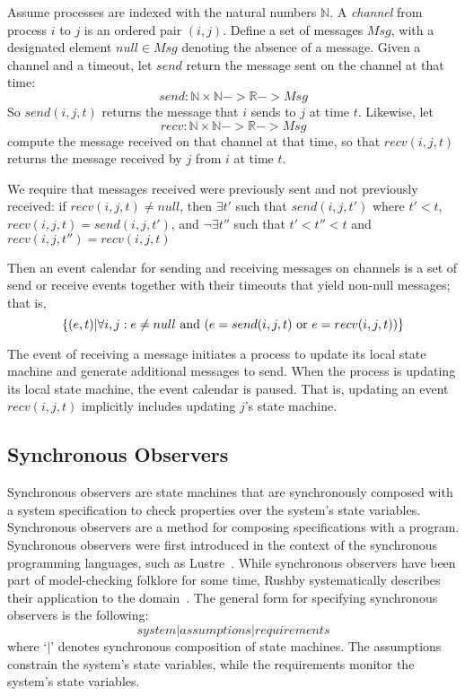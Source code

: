 \documentclass{IEEEtran/IEEEtran}
\newcommand{\lee}[1]{ } %
\newcommand{\lee}[1]{ {\color{blue}$<$lee: #1$>$} } %
\begin{document}
Assume processes are indexed with the natural numbers $\mathbb{N}$. A \emph{channel} from process $i$ to $j$ is an ordered pair $(i,j)$. Define a set of messages $Msg$, with a designated element $null \in Msg$ denoting the absence of a message. Given a channel and a timeout, let $send$ return the message sent on the channel at that time:
$$send : \mathbb{N} \times \mathbb{N} -> \mathbb{R} -> Msg$$
So $send(i, j, t)$ returns the message that $i$ sends to $j$ at time $t$. Likewise, let
$$recv : \mathbb{N} \times \mathbb{N} -> \mathbb{R} -> Msg$$
compute the message received on that channel at that time, so that $recv(i, j, t)$ returns the message received by $j$ from $i$ at time $t$.

We require that messages received were previously sent and not previously received: if $recv(i, j, t) \neq null$, then $\exists t'$ such that $send(i, j, t')$ where $t' < t$, $recv(i, j, t) = send(i, j, t')$, and $\neg\exists t''$ such that $t' < t'' < t$ and $recv(i, j, t'') = recv(i, j, t)$

Then an event calendar for sending and receiving messages on channels is a set of send or receive events together with their timeouts that yield non-null messages; that is,
$$
\{ (e, t) | \forall i,j: e \neq null \textnormal{ and } (e = send(i, j, t) \textnormal{ or } e = recv(i, j, t))
\}
$$

\lee{technically, atomic time is just a convenience.}
The event of receiving a message initiates a process to update its local state machine and generate additional messages to send. When the process is updating its local state machine, the event calendar is paused. That is, updating an event $recv(i, j, t)$ implicitly includes updating $j$'s state machine.

\lee{note that we don't need full generality of send and receive events in OM(1)}

\subsection{Synchronous Observers}\label{sec:sync}
Synchronous observers are state machines that are synchronously composed with a system specification to check properties over the system's state variables. Synchronous observers are a method for composing specifications with a program. Synchronous observers were first introduced in the context of the synchronous programming languages, such as Lustre~\cite{}. While synchronous observers have been part of model-checking folklore for some time, Rushby systematically describes their application to the domain~\cite{}. The general form for specifying synchronous observers is the following:
$$system | assumptions | requirements$$
\noindent
where `$|$' denotes synchronous composition of state machines. The assumptions constrain the system's state variables, while the requirements monitor the system's state variables.
\end{document}
